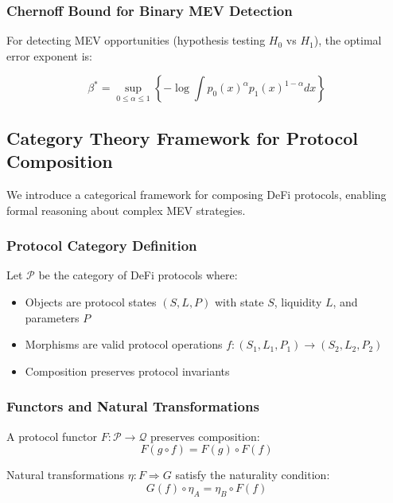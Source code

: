 \documentclass[12pt]{article}
\begin{document}
\subsubsection{Chernoff Bound for Binary MEV Detection}

For detecting MEV opportunities (hypothesis testing $H_0$ vs $H_1$), the optimal error exponent is:

\begin{equation}
\beta^* = \sup_{0 \leq \alpha \leq 1} \left\{-\log \int p_0(x)^{\alpha} p_1(x)^{1-\alpha} dx\right\}
\end{equation}

\subsection{Category Theory Framework for Protocol Composition}

We introduce a categorical framework for composing DeFi protocols, enabling formal reasoning about complex MEV strategies.

\subsubsection{Protocol Category Definition}

Let $\mathcal{P}$ be the category of DeFi protocols where:
\begin{itemize}
    \item Objects are protocol states $(S, L, P)$ with state $S$, liquidity $L$, and parameters $P$
    \item Morphisms are valid protocol operations $f: (S_1, L_1, P_1) \to (S_2, L_2, P_2)$
    \item Composition preserves protocol invariants
\end{itemize}

\subsubsection{Functors and Natural Transformations}

A protocol functor $F: \mathcal{P} \to \mathcal{Q}$ preserves composition:
\begin{equation}
F(g \circ f) = F(g) \circ F(f)
\end{equation}

Natural transformations $\eta: F \Rightarrow G$ satisfy the naturality condition:
\begin{equation}
G(f) \circ \eta_A = \eta_B \circ F(f)
\end{equation}
\end{document}
